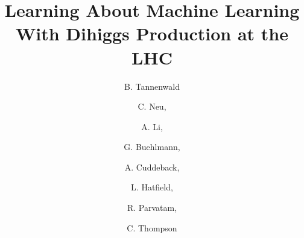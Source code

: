 \documentclass[a4paper,11pt]{article}
\title{\boldmath Learning About Machine Learning With Dihiggs Production at the LHC}
\author[a]{B. Tannenwald}
\author[a]{C. Neu,}
\author[a]{A. Li,}
\author[a]{G. Buehlmann,}
\author[a]{A. Cuddeback,}
\author[a]{L. Hatfield,}
\author[a]{R. Parvatam,}
\author[a]{C. Thompson}
\affiliation[a]{University of Virginia, 248 McCormick Road, Charlottesville, VA, USA}
\begin{document}
 
\linenumbers
\maketitle
\flushbottom



%
%












%

%

\nocite{*} %
%

\cleardoublepage
{}





%
\end{document}

